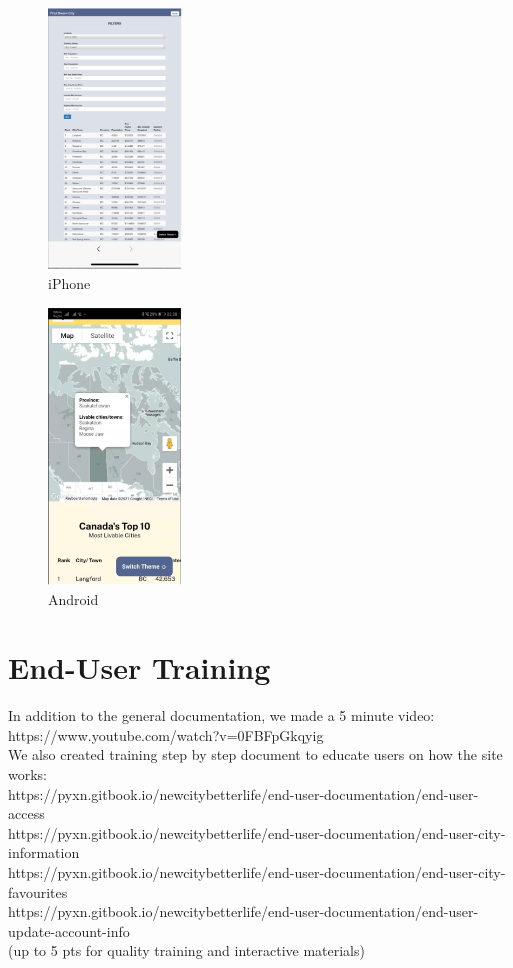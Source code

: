 \documentclass[12pt, letterpaper]{article}
\begin{document}
 \newpage
 
 \begin{figure}[htbp]
	\centering
	\includegraphics[width=1.4in]{images/q12-iphone.png}
	\caption{iPhone}
 \end{figure}
 
 \begin{figure}[htbp]
	\centering
	\includegraphics[width=1.4in]{images/q12-android.png}
	\caption{Android}
 \end{figure}
 
 \newpage


\section{End-User Training}
In addition to the general documentation, we made a 5 minute video:
\\https://www.youtube.com/watch?v=0FBFpGkqyig
\\We also created training step by step document to educate users on how the site works: 
\\https://pyxn.gitbook.io/newcitybetterlife/end-user-documentation/end-user-access
\\https://pyxn.gitbook.io/newcitybetterlife/end-user-documentation/end-user-city-information
\\https://pyxn.gitbook.io/newcitybetterlife/end-user-documentation/end-user-city-favourites
\\https://pyxn.gitbook.io/newcitybetterlife/end-user-documentation/end-user-update-account-info
\\(up to 5 pts for quality training and interactive materials)
\end{document}

